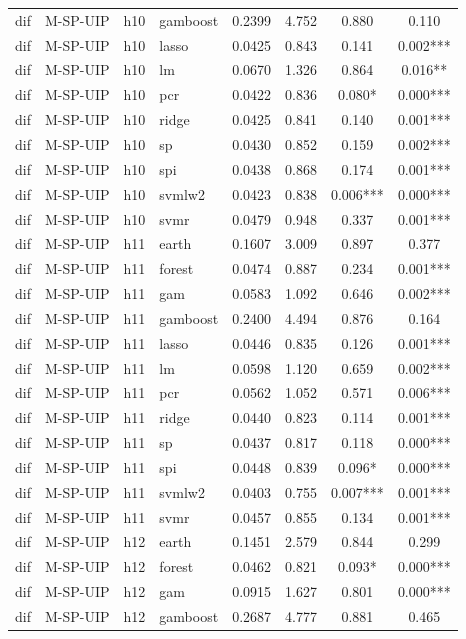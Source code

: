 \begin{ThreePartTable}
\begin{longtable}[t]{llclcccc}
dif & M-SP-UIP & h10 & gamboost & 0.2399 & 4.752 & 0.880 & 0.110\\
dif & M-SP-UIP & h10 & lasso & 0.0425 & 0.843 & 0.141 & 0.002***\\
dif & M-SP-UIP & h10 & lm & 0.0670 & 1.326 & 0.864 & 0.016**\\
dif & M-SP-UIP & h10 & pcr & 0.0422 & 0.836 & 0.080* & 0.000***\\
dif & M-SP-UIP & h10 & ridge & 0.0425 & 0.841 & 0.140 & 0.001***\\
dif & M-SP-UIP & h10 & sp & 0.0430 & 0.852 & 0.159 & 0.002***\\
dif & M-SP-UIP & h10 & spi & 0.0438 & 0.868 & 0.174 & 0.001***\\
dif & M-SP-UIP & h10 & svmlw2 & 0.0423 & 0.838 & 0.006*** & 0.000***\\
dif & M-SP-UIP & h10 & svmr & 0.0479 & 0.948 & 0.337 & 0.001***\\
\addlinespace
dif & M-SP-UIP & h11 & earth & 0.1607 & 3.009 & 0.897 & 0.377\\
dif & M-SP-UIP & h11 & forest & 0.0474 & 0.887 & 0.234 & 0.001***\\
dif & M-SP-UIP & h11 & gam & 0.0583 & 1.092 & 0.646 & 0.002***\\
dif & M-SP-UIP & h11 & gamboost & 0.2400 & 4.494 & 0.876 & 0.164\\
dif & M-SP-UIP & h11 & lasso & 0.0446 & 0.835 & 0.126 & 0.001***\\
dif & M-SP-UIP & h11 & lm & 0.0598 & 1.120 & 0.659 & 0.002***\\
dif & M-SP-UIP & h11 & pcr & 0.0562 & 1.052 & 0.571 & 0.006***\\
dif & M-SP-UIP & h11 & ridge & 0.0440 & 0.823 & 0.114 & 0.001***\\
dif & M-SP-UIP & h11 & sp & 0.0437 & 0.817 & 0.118 & 0.000***\\
dif & M-SP-UIP & h11 & spi & 0.0448 & 0.839 & 0.096* & 0.000***\\
dif & M-SP-UIP & h11 & svmlw2 & 0.0403 & 0.755 & 0.007*** & 0.001***\\
dif & M-SP-UIP & h11 & svmr & 0.0457 & 0.855 & 0.134 & 0.001***\\
\addlinespace
dif & M-SP-UIP & h12 & earth & 0.1451 & 2.579 & 0.844 & 0.299\\
dif & M-SP-UIP & h12 & forest & 0.0462 & 0.821 & 0.093* & 0.000***\\
dif & M-SP-UIP & h12 & gam & 0.0915 & 1.627 & 0.801 & 0.000***\\
dif & M-SP-UIP & h12 & gamboost & 0.2687 & 4.777 & 0.881 & 0.465\\

\end{longtable}
\end{ThreePartTable}
